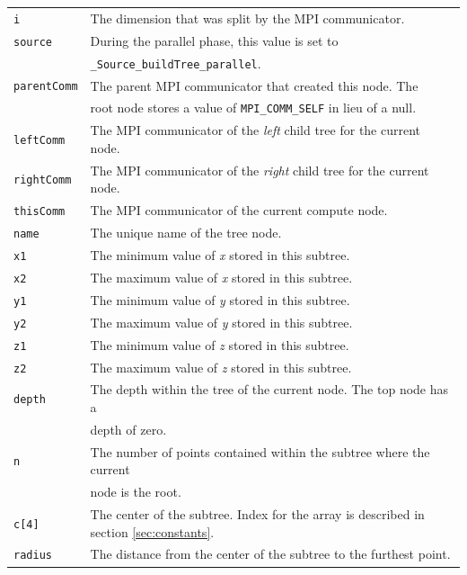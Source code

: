 \documentclass{article}
\begin{document}
\begin{tabular}{l l}
\texttt{i} & The dimension that was split by the MPI communicator.  \\
\texttt{source} & During the parallel phase, this value is set to  \\
& \texttt{\_Source\_buildTree\_parallel}.  \\
\texttt{parentComm} & The parent MPI communicator that created this node. The\\
&  root node stores a value of \texttt{MPI\_COMM\_SELF} in lieu of a null. \\
\texttt{leftComm} & The MPI communicator of the \textit{left} child tree for the current node.  \\
\texttt{rightComm} & The MPI communicator of the \textit{right} child tree for the current node.  \\
\texttt{thisComm} & The MPI communicator of the current compute node.  \\
\texttt{name} & The unique name of the tree node. \\
\texttt{x1} & The minimum value of \textit{x} stored in this subtree.  \\
\texttt{x2} & The maximum value of \textit{x} stored in this subtree.  \\
\texttt{y1} & The minimum value of \textit{y} stored in this subtree.  \\
\texttt{y2} & The maximum value of \textit{y} stored in this subtree.  \\
\texttt{z1} & The minimum value of \textit{z} stored in this subtree.  \\
\texttt{z2} & The maximum value of \textit{z} stored in this subtree.  \\
\texttt{depth} & The depth within the tree of the current node. The top node has a \\
& depth of zero.  \\
\texttt{n} & The number of points contained within the subtree where the current \\
& node is the root.  \\
\texttt{c[4]} & The center of the subtree. Index for the array is described in section \ref{sec:constants}. \\
\texttt{radius} & The distance from the center of the subtree to the furthest point.  \\
\end{tabular}
\end{document}
